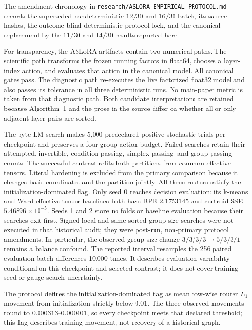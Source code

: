 The amendment chronology in
\texttt{research/ASLORA\_EMPIRICAL\_PROTOCOL.md} records the superseded
nondeterministic \(12/30\) and \(16/30\) batch, its source hashes, the
outcome-blind deterministic protocol lock, and the canonical replacement by
the \(11/30\) and \(14/30\) results reported here.

For transparency, the ASLoRA artifacts contain two numerical paths.  The
scientific path transforms the frozen running factors in float64, chooses a
layer-index action, and evaluates that action in the canonical model.  All
canonical gates pass.  The diagnostic path re-executes the live factorized
float32 model and also passes its tolerance in all three deterministic runs.
No main-paper metric is taken from that diagnostic path.  Both
candidate interpretations are retained because Algorithm~1 and the prose in
the source differ on whether all or only adjacent layer pairs are sorted.





The byte-LM search makes 5,000 predeclared positive-stochastic trials per
checkpoint and preserves a four-group action budget.  Failed searches retain
their attempted, invertible, condition-passing, simplex-passing, and
group-passing counts.  The successful contrast refits both partitions from
common effective tensors.  Literal hardening is excluded from the primary
comparison because it changes basis coordinates and the partition jointly.
All three routers satisfy the initialization-dominated flag.  Only seed 0
reaches decision evaluation: its k-means and Ward effective-tensor baselines
both have BPB $2.1753145$ and centroid SSE $5.46896\times10^{-5}$.  Seeds 1 and
2 store no folds or baseline evaluation because their searches exit first.
Signed-local and same-sorted-group-size searches were not executed in that
historical audit; they were
post-run, non-primary protocol amendments.  In particular, the observed
group-size change $3/3/3/3\to5/3/3/1$ remains a balance confound.
The reported interval resamples the 256 paired evaluation-batch differences
10,000 times. It describes evaluation variability conditional on this
checkpoint and selected contrast; it does not cover training-seed or
gauge-search uncertainty.

The protocol defines the initialization-dominated flag as mean row-wise router
$L_1$ movement from initialization strictly below $0.01$.  The three observed
movements round to $0.000313$--$0.000401$, so every checkpoint meets that
declared threshold; this flag describes training movement, not recovery of a
historical graph.

